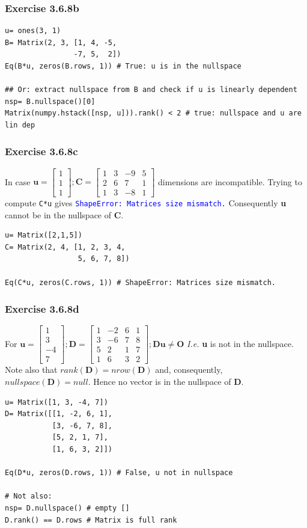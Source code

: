 \subsubsection{Exercise 3.6.8b}

\begin{verbatim}
u= ones(3, 1)
B= Matrix(2, 3, [1, 4, -5,
                -7, 5,  2])
Eq(B*u, zeros(B.rows, 1)) # True: u is in the nullspace

## Or: extract nullspace from B and check if u is linearly dependent
nsp= B.nullspace()[0]
Matrix(numpy.hstack([nsp, u])).rank() < 2 # true: nullspace and u are lin dep
\end{verbatim}

\subsubsection{Exercise 3.6.8c}

In case $\mathbf{u} = \left[\begin{matrix}1\\1\\1\end{matrix}\right];
\mathbf{C}= \left[\begin{matrix}1 & 3 & -9 & 5\\2 & 6 & 7 & 1\\1 & 3 & -8 & 1\end{matrix}\right]
$ dimensions are incompatible. Trying to compute \texttt{C*u} gives
\textcolor{blue}{\texttt{ShapeError: Matrices size mismatch.}} Consequently \textbf{u}
cannot be in the nullspace of \textbf{C}.

\begin{verbatim}
u= Matrix([2,1,5])
C= Matrix(2, 4, [1, 2, 3, 4,
                 5, 6, 7, 8])

Eq(C*u, zeros(C.rows, 1)) # ShapeError: Matrices size mismatch.
\end{verbatim}

\subsubsection{Exercise 3.6.8d}

For $\mathbf{u}= \left[\begin{matrix}1\\3\\-4\\7\end{matrix}\right];
\mathbf{D}= \left[\begin{matrix}1 & -2 & 6 & 1\\3 & -6 & 7 & 8\\5 & 2 & 1 & 7\\1 & 6 & 3 & 2\end{matrix}\right];
\mathbf{Du} \neq \mathbf{O}$ \emph{I.e.} \textbf{u} is not in the nullspace. Note also
that $rank(\mathbf{D}) = nrow(\mathbf{D})$ and, consequently, $nullspace(\mathbf{D}) = null$.
Hence no vector is in the nullspace of \textbf{D}.


\begin{verbatim}
u= Matrix([1, 3, -4, 7])
D= Matrix([[1, -2, 6, 1],
           [3, -6, 7, 8],
           [5, 2, 1, 7],
           [1, 6, 3, 2]])

Eq(D*u, zeros(D.rows, 1)) # False, u not in nullspace

# Not also:
nsp= D.nullspace() # empty []
D.rank() == D.rows # Matrix is full rank
\end{verbatim}